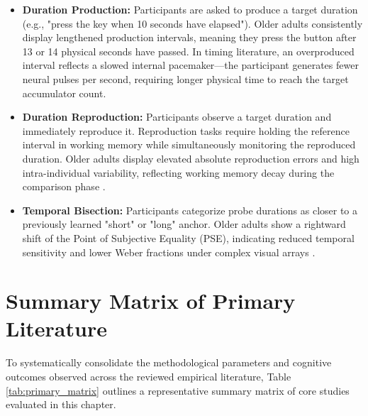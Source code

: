 \documentclass{custom_report}
\begin{document}
\begin{itemize}
    \item \textbf{Duration Production:} Participants are asked to produce a target duration (e.g., "press the key when 10 seconds have elapsed"). Older adults consistently display lengthened production intervals, meaning they press the button after 13 or 14 physical seconds have passed. In timing literature, an overproduced interval reflects a slowed internal pacemaker—the participant generates fewer neural pulses per second, requiring longer physical time to reach the target accumulator count.
    \item \textbf{Duration Reproduction:} Participants observe a target duration and immediately reproduce it. Reproduction tasks require holding the reference interval in working memory while simultaneously monitoring the reproduced duration. Older adults display elevated absolute reproduction errors and high intra-individual variability, reflecting working memory decay during the comparison phase \cite{Craik1999}.
    \item \textbf{Temporal Bisection:} Participants categorize probe durations as closer to a previously learned "short" or "long" anchor. Older adults show a rightward shift of the Point of Subjective Equality (PSE), indicating reduced temporal sensitivity and lower Weber fractions under complex visual arrays \cite{Turgeon2016}.
\end{itemize}

\section{Summary Matrix of Primary Literature}
To systematically consolidate the methodological parameters and cognitive outcomes observed across the reviewed empirical literature, Table \ref{tab:primary_matrix} outlines a representative summary matrix of core studies evaluated in this chapter.
\end{document}
